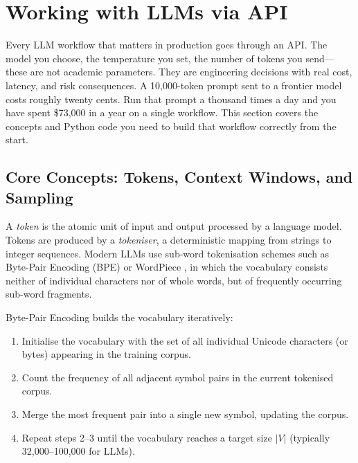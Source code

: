 \section{Working with LLMs via API}
\label{sec:api}

\begin{context}

Every LLM workflow that matters in production goes through an API.  The model you
choose, the temperature you set, the number of tokens you send---these are not
academic parameters.  They are engineering decisions with real cost, latency, and
risk consequences.  A 10,000-token prompt sent to a frontier model costs roughly
twenty cents.  Run that prompt a thousand times a day and you have spent
\$73,000 in a year on a single workflow.  This section covers the concepts and
Python code you need to build that workflow correctly from the start.

\subsection{Core Concepts: Tokens, Context Windows, and Sampling}
\label{sec:api-concepts}

\begin{definition}[Token]
\label{def:token}
A \emph{token} is the atomic unit of input and output processed by a language model.
Tokens are produced by a \emph{tokeniser}, a deterministic mapping from strings to
integer sequences.  Modern LLMs use sub-word tokenisation schemes such as Byte-Pair
Encoding (BPE) \cite{sennrich2016bpe} %
or WordPiece \cite{wu2016wordpiece}, %
in which the vocabulary consists neither of individual characters nor of whole words,
but of frequently occurring sub-word fragments.
\end{definition}

Byte-Pair Encoding builds the vocabulary iteratively:
\begin{enumerate}
  \item Initialise the vocabulary with the set of all individual Unicode characters
    (or bytes) appearing in the training corpus.
  \item Count the frequency of all adjacent symbol pairs in the current tokenised
    corpus.
  \item Merge the most frequent pair into a single new symbol, updating the corpus.
  \item Repeat steps 2--3 until the vocabulary reaches a target size $|V|$
    (typically 32,000--100,000 for LLMs).
\end{enumerate}


\end{context}

